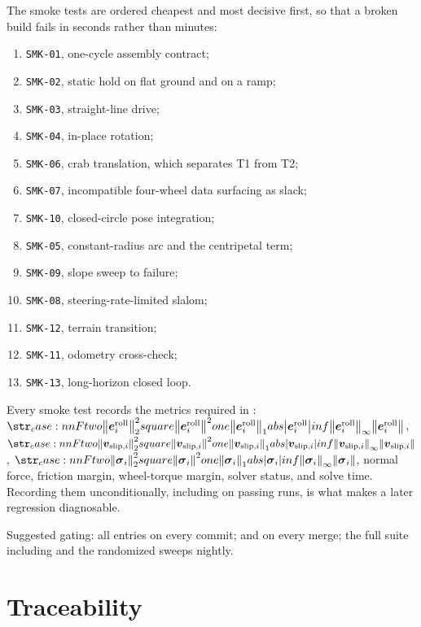 \documentclass[10pt]{article}
\newcommand{\slipVelocity}[1]{\contactVel_{\text{slip},#1}}
\newcommand{\rollingResidual}{\bs{e}^{\text{roll}}}
\newcommand{\slackVariable}{\bs{\sigma}}
\begin{document}
The smoke tests are ordered cheapest and most decisive first, so that a broken
build fails in seconds rather than minutes:
\begin{enumerate}
  \item \texttt{SMK-01}, one-cycle assembly contract;
  \item \texttt{SMK-02}, static hold on flat ground and on a ramp;
  \item \texttt{SMK-03}, straight-line drive;
  \item \texttt{SMK-04}, in-place rotation;
  \item \texttt{SMK-06}, crab translation, which separates T1 from T2;
  \item \texttt{SMK-07}, incompatible four-wheel data surfacing as slack;
  \item \texttt{SMK-10}, closed-circle pose integration;
  \item \texttt{SMK-05}, constant-radius arc and the centripetal term;
  \item \texttt{SMK-09}, slope sweep to failure;
  \item \texttt{SMK-08}, steering-rate-limited slalom;
  \item \texttt{SMK-12}, terrain transition;
  \item \texttt{SMK-11}, odometry cross-check;
  \item \texttt{SMK-13}, long-horizon closed loop.
\end{enumerate}

Every smoke test records the metrics required in
: $\norm{\rollingResidual_i}$,
$\norm{\slipVelocity{i}}$, $\norm{\slackVariable_i}$, normal force, friction
margin, wheel-torque margin, solver status, and solve time. Recording them
unconditionally, including on passing runs, is what makes a later regression
diagnosable.

Suggested gating: all  entries on every commit;  and
 on every merge; the full suite including  and the
randomized sweeps nightly.

\section{Traceability}
\label{sec:test-traceability}
\end{document}
